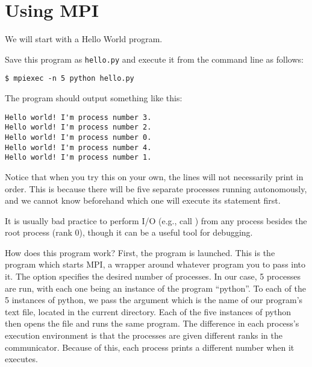 \section*{Using MPI}
We will start with a Hello World program.

Save this program as \texttt{hello.py} and execute it from the command line as follows:
\begin{lstlisting}[style=ShellInput]
$ mpiexec -n 5 python hello.py
\end{lstlisting}
The program should output something like this:
\begin{lstlisting}[style=ShellOutput]
Hello world! I'm process number 3.
Hello world! I'm process number 2.
Hello world! I'm process number 0.
Hello world! I'm process number 4.
Hello world! I'm process number 1.
\end{lstlisting}
Notice that when you try this on your own, the lines will not necessarily print in order.
This is because there will be five separate processes running autonomously, and we cannot know beforehand which one will execute its  statement first.

\begin{warn}
It is usually bad practice to perform I/O (e.g., call ) from any process besides the root process (rank $0$), though it can be a useful tool for debugging.
\end{warn}

How does this program work?
First, the  program is launched.
This is the program which starts MPI, a wrapper around whatever program you to pass into it.
The  option specifies the desired number of processes.
In our case, 5 processes are run, with each one being an instance of the program ``python''.
To each of the 5 instances of python, we pass the argument  which is the name of our program's text file, located in the current directory.
Each of the five instances of python then opens the  file and runs the same program.
The difference in each process's execution environment is that the processes are given different ranks in the communicator.
Because of this, each process prints a different number when it executes.

